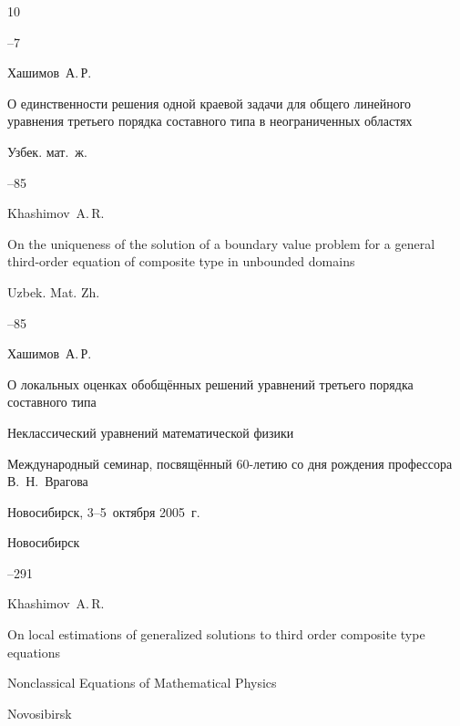 \begin{thebibliography}{10}


--7






\by Хашимов~А.\,Р. 

\paper О единственности  решения одной краевой задачи для общего линейного уравнения третьего порядка составного типа в неограниченных областях 

\jour Узбек. мат.~ж. 



--85

\misctransl

\by Khashimov~A.\,R.

\paper  On the uniqueness of the solution of a boundary value problem for a general third-order equation of composite type in unbounded domains

\jour Uzbek. Mat. Zh.



–85



%

%




\by Хашимов~А.\,Р. 

\paper О локальных оценках обобщённых решений уравнений третьего порядка составного типа 

\inbook Неклассический уравнений математической физики

\bookinfo Международный семинар, посвящённый 60-летию со дня рождения профессора В.~Н.~Врагова

\procinfo Новосибирск, 3--5~октября 2005~г.

\publaddr Новосибирск 


--291

\misctransl

\by Khashimov~A.\,R.

\paper On local estimations of generalized solutions to third order composite type equations 

\inbook Nonclassical Equations of Mathematical Physics

\publaddr Novosibirsk


\end{thebibliography}
